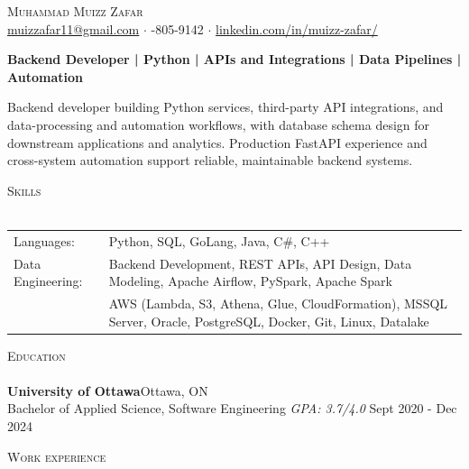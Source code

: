 \documentclass[a4paper]{article}
\newcommand{\lineunder} {
    \vspace*{-8pt} \\
    \hspace*{-18pt} \hrulefill \\
}
\newcommand{\header} [1] {
    {\hspace*{-18pt}\vspace*{6pt} \textsc{#1}}
    \vspace*{-6pt} \lineunder
}
\begin{document}
\vspace*{-40pt}

\vspace*{-10pt}
\begin{center}
	{\Huge \scshape {Muhammad Muizz Zafar}}\\
	\faSend \space \href{mailto:muizzafar11@gmail.com}{muizzafar11@gmail.com} $\cdot$ \faPhoneSquare {}-805-9142 $\cdot$ \faLinkedinSquare \space \href{https://www.linkedin.com/in/muizz-zafar/}{linkedin.com/in/muizz-zafar/}
	\\
\end{center}

\vspace{-5pt}
\begin{center}
\textbf{Backend Developer | Python | APIs and Integrations | Data Pipelines | Automation}
\end{center}
\begin{center}
Backend developer building Python services, third-party API integrations, and data-processing and automation workflows, with database schema design for downstream applications and analytics. Production FastAPI experience and cross-system automation support reliable, maintainable backend systems.
\end{center}

\header{Skills}
\begin{tabular}{ l l }
	Languages: 
& Python, SQL, GoLang, Java, C\#, C++ \\

Data Engineering: 
& Backend Development, REST APIs, API Design, Data Modeling, Apache Airflow, PySpark, Apache Spark\\
& AWS (Lambda, S3, Athena, Glue, CloudFormation), MSSQL Server, Oracle, PostgreSQL, Docker, Git, Linux, Datalake

\end{tabular}

\header{Education}
\textbf{University of Ottawa}\hfill Ottawa, ON\\
Bachelor of Applied Science, Software Engineering \textit{GPA: 3.7/4.0} \hfill Sept 2020 - Dec 2024\\
\vspace{2mm}

\header{Work experience}
\vspace{1.5mm}
\end{document}
